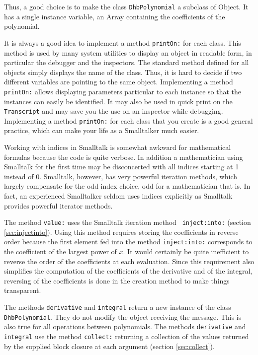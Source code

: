\documentclass[twoside]{book}
\begin{document}
Thus, a good choice is to make the class {\tt DhbPolynomial} a
subclass of Object. It has a single instance variable, an Array
containing the coefficients of the polynomial.

It is always a good idea to implement a method {\tt printOn:} for
each class. This method is used by many system utilities to
display an object in readable form, in particular the debugger and
the inspectors. The standard method defined for all objects simply
displays the name of the class. Thus, it is hard to decide if two
different variables are pointing to the same object. Implementing
a method {\tt printOn:} allows displaying parameters particular to
each instance so that the instances can easily be identified. It
may also be used in quick print on the {\tt Transcript} and may
save you the use on an inspector while debugging. Implementing a
method {\tt printOn:} for each class that you create is a good
general practice, which can make your life as a Smalltalker much
easier.

Working with indices in Smalltalk is somewhat awkward for
mathematical formulas because the code is quite verbose. In
addition a mathematician using Smalltalk for the first time may be
disconcerted with all indices starting at 1 instead of 0.
Smalltalk, however, has very powerful iteration methods, which
largely compensate for the odd index choice, odd for a
mathematician that is. In fact, an experienced Smalltalker seldom
uses indices explicitly as Smalltalk provides powerful iterator
methods.

The method {\tt value:} uses the Smalltalk iteration method {\tt
inject:into:} (\cf section \ref{sec:injectinto}). Using this
method requires storing the coefficients in reverse order because
the first element fed into the method {\tt inject:into:}
corresponds to the coefficient of the largest power of $x$. It
would certainly be quite inefficient to reverse the order of the
coefficients at each evaluation. Since this requirement also
simplifies the computation of the coefficients of the derivative
and of the integral, reversing of the coefficients is done in the
creation method to make things transparent.

The methods {\tt derivative} and {\tt integral} return a new
instance of the class {\tt DhbPolynomial}. They do not modify the
object receiving the message. This is also true for all operations
between polynomials. The methods {\tt derivative} and {\tt
integral} use the method {\tt collect:} returning a collection of
the values returned by the supplied block closure at each argument
(\cf section \ref{sec:collect}).
\end{document}
